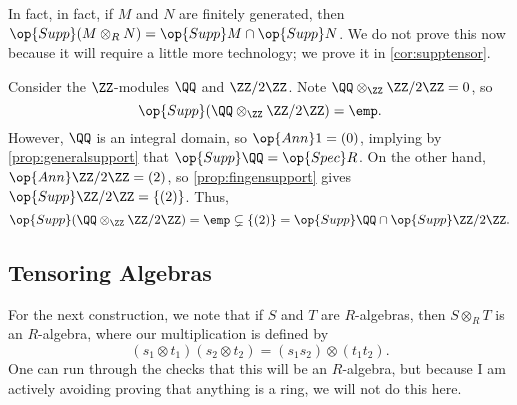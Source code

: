 \begin{remark} \label{rem:supptensor}
	In fact, in fact, if $M$ and $N$ are finitely generated, then $\op{Supp}(M\otimes_RN)=\op{Supp}M\cap\op{Supp}N$. We do not prove this now because it will require a little more technology; we prove it in \autoref{cor:supptensor}.
\end{remark}
\begin{ex}
	Consider the $\ZZ$-modules $\QQ$ and $\ZZ/2\ZZ$. Note $\QQ\otimes_\ZZ\ZZ/2\ZZ=0$, so
	\[\op{Supp}(\QQ\otimes_\ZZ\ZZ/2\ZZ)=\emp.\]
	However, $\QQ$ is an integral domain, so $\op{Ann}1=(0)$, implying by \autoref{prop:generalsupport} that $\op{Supp}\QQ=\op{Spec}R$. On the other hand, $\op{Ann}\ZZ/2\ZZ=(2)$, so \autoref{prop:fingensupport} gives $\op{Supp}\ZZ/2\ZZ=\{(2)\}$. Thus,
	\[\op{Supp}(\QQ\otimes_\ZZ\ZZ/2\ZZ)=\emp\subsetneq\{(2)\}=\op{Supp}\QQ\cap\op{Supp}\ZZ/2\ZZ.\]
\end{ex}

\subsection{Tensoring Algebras}
For the next construction, we note that if $S$ and $T$ are $R$-algebras, then $S\otimes_RT$ is an $R$-algebra, where our multiplication is defined by
\[(s_1\otimes t_1)(s_2\otimes t_2)=(s_1s_2)\otimes(t_1t_2).\]
One can run through the checks that this will be an $R$-algebra, but because I am actively avoiding proving that anything is a ring, we will not do this here.

